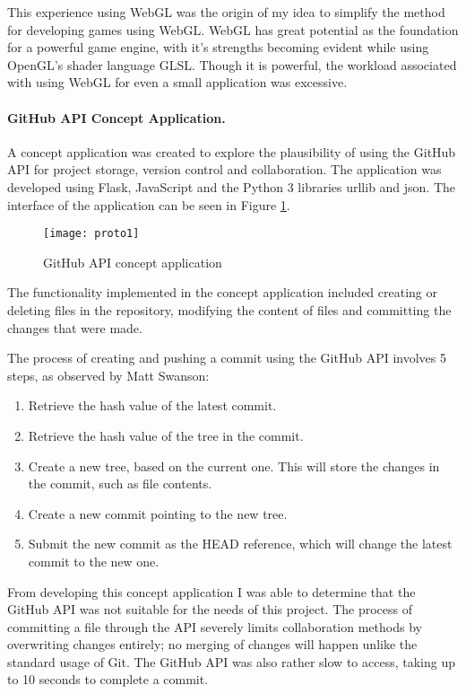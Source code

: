 This experience using WebGL was the origin of my idea to simplify the method for developing games using WebGL. WebGL has great potential as the foundation for a powerful game engine, with it's strengths becoming evident while using OpenGL's shader language GLSL. Though it is powerful, the workload associated with using WebGL for even a small application was excessive.

\paragraph{GitHub API Concept Application.}
A concept application was created to explore the plausibility of using the GitHub API for project storage, version control and collaboration. The application was developed using Flask, JavaScript and the Python 3 libraries urllib and json. The interface of the application can be seen in Figure \ref{fig:proto1}.

\begin{figure}[h]
	\centering
	\texttt{[image: proto1]}
	\caption{GitHub API concept application}
	\label{fig:proto1}
\end{figure}

The functionality implemented in the concept application included creating or deleting files in the repository, modifying the content of files and committing the changes that were made.

The process of creating and pushing a commit using the GitHub API involves 5 steps, as observed by Matt Swanson\cite{githubapicommit}:
\begin{enumerate}
	\item Retrieve the hash value of the latest commit.
	\item Retrieve the hash value of the tree in the commit.
	\item Create a new tree, based on the current one. This will store the changes in the commit, such as file contents.
	\item Create a new commit pointing to the new tree.
	\item Submit the new commit as the HEAD reference, which will change the latest commit to the new one.
\end{enumerate}

From developing this concept application I was able to determine that the GitHub API was not suitable for the needs of this project. The process of committing a file through the API severely limits collaboration methods by overwriting changes entirely; no merging of changes will happen unlike the standard usage of Git. The GitHub API was also rather slow to access, taking up to 10 seconds to complete a commit.

